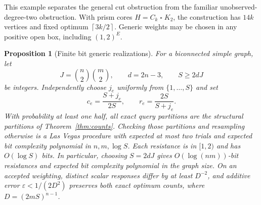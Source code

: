 \documentclass[11pt,letterpaper]{article}
\newtheorem{proposition}[theorem]{Proposition}
\newcommand{\ceil}[1]{\left\lceil #1\right\rceil}
\begin{document}
This example separates the general cut obstruction from the familiar unobserved-degree-two obstruction. With prism cores $H=C_k\mathbin{\square}K_2$, the construction has $14k$ vertices and fixed optimum $\ceil{3k/2}$. Generic weights may be chosen in any positive open box, including $(1,2)^E$.

\begin{proposition}[Finite bit generic realizations]\label{prop:grid}
For a biconnected simple graph, let
\[
 J=\binom n2\binom m2,\qquad d=2n-3,\qquad S\ge2dJ
\]
be integers. Independently choose $j_e$ uniformly from $\{1,\ldots,S\}$ and set
\[
 c_e=\frac{S+j_e}{2S},\qquad r_e=\frac{2S}{S+j_e}.
\]
With probability at least one half, all exact query partitions are the structural partitions of Theorem~\ref{thm:counts}. Checking those partitions and resampling otherwise is a Las Vegas procedure with expected at most two trials and expected bit complexity polynomial in $n,m,\log S$. Each resistance is in $[1,2)$ and has $O(\log S)$ bits. In particular, choosing $S=2dJ$ gives $O(\log(nm))$-bit resistances and expected bit complexity polynomial in the graph size. On an accepted weighting, distinct scalar responses differ by at least $D^{-2}$, and additive error $\varepsilon<1/(2D^2)$ preserves both exact optimum counts, where $D=(2mS)^{n-1}$.
\end{proposition}
\end{document}
